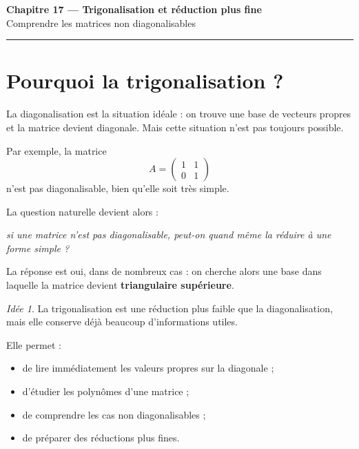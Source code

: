 \documentclass[11pt,a4paper]{article}
\theoremstyle{remark}
\newtheorem*{idee}{Idée}
\begin{document}
\begin{center}
    {\LARGE \textbf{Chapitre 17 --- Trigonalisation et réduction plus fine}}\\[0.4em]
    {\large Comprendre les matrices non diagonalisables}
\end{center}

\hrule
\vspace{1em}

\tableofcontents

\newpage

\section{Pourquoi la trigonalisation ?}

La diagonalisation est la situation idéale : on trouve une base de vecteurs propres et la matrice devient diagonale.  
Mais cette situation n’est pas toujours possible.

Par exemple, la matrice
\[
A=
\begin{pmatrix}
1 & 1\\
0 & 1
\end{pmatrix}
\]
n’est pas diagonalisable, bien qu’elle soit très simple.

La question naturelle devient alors :

\begin{center}
\textit{si une matrice n’est pas diagonalisable, peut-on quand même la réduire à une forme simple ?}
\end{center}

La réponse est oui, dans de nombreux cas : on cherche alors une base dans laquelle la matrice devient \textbf{triangulaire supérieure}.

\begin{idee}
La trigonalisation est une réduction plus faible que la diagonalisation, mais elle conserve déjà beaucoup d’informations utiles.
\end{idee}

Elle permet :
\begin{itemize}
    \item de lire immédiatement les valeurs propres sur la diagonale ;
    \item d’étudier les polynômes d’une matrice ;
    \item de comprendre les cas non diagonalisables ;
    \item de préparer des réductions plus fines.
\end{itemize}
\end{document}
